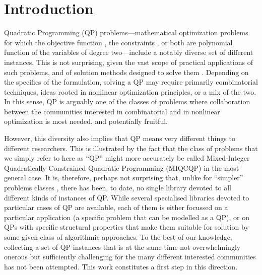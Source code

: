 
\section{Introduction}\label{sec:intro}

Quadratic Programming (QP) problems---mathematical optimization problems for which the objective function \cite{wiki:qp}, the constraints \cite{wiki:qcqp}, or both are polynomial function of the variables of degree two---include a notably diverse set of different instances. This is not surprising, given the vast scope of practical applications of such problems, and of solution methods designed to solve them \cite{GoulToin00a}. Depending on the specifics of the formulation, solving a QP may require primarily combinatorial techniques, ideas rooted in nonlinear optimization principles, or a mix of the two. In this sense, QP is arguably one of the classes of problems where collaboration between the communities interested in combinatorial and in nonlinear optimization is most needed, and potentially fruitful.

However, this diversity also implies that QP means very different things to different researchers. This is illustrated by the fact that the class of problems that we simply refer to here as ``QP'' might more accurately be called Mixed-Integer Quadratically-Constrained Quadratic Programming (MIQCQP) in the most general case. It is, therefore, perhaps not surprising that, unlike for ``simpler'' problems classes \cite{Koch2011},  there has been, to date, no single library devoted to all different kinds of instances of QP. While several specialised libraries devoted to particular cases of QP are available, each of them is either focussed on a particular application (a specific problem that can be modelled as a QP), or on QPs with specific structural properties that make them suitable for solution by some given class of algorithmic approaches. To the best of our knowledge, collecting a set of QP instances that is at the same time not overwhelmingly onerous but sufficiently challenging for the many different interested communities has not been attempted. This work constitutes a first step in this direction.


